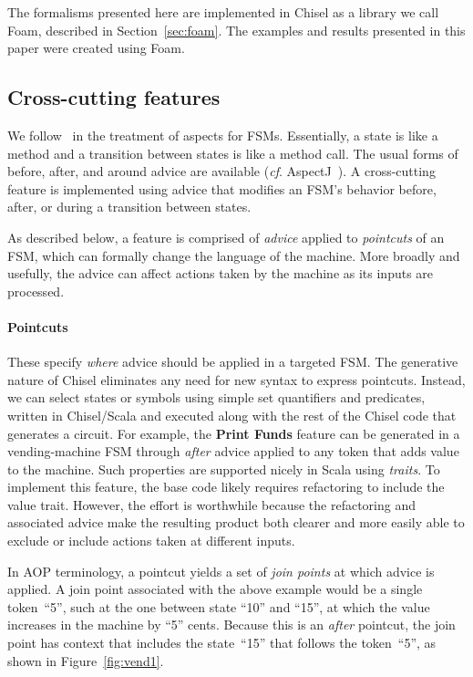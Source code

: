 \documentclass[sigplan,anonymous,review]{acmart}
\begin{document}
The formalisms presented here are implemented in Chisel as a library we call Foam, described in Section~\ref{sec:foam}.  The examples and results presented in this paper were created using Foam.  

\subsection{Cross-cutting features}\label{sec:ccut}
We follow~\cite{aspectsUML} in the treatment of aspects for FSMs.  Essentially, a state is like a method and a transition between states is like a method call.  The usual forms of before, after, and around advice are available (\emph{cf}. AspectJ~\cite{AspectJ:01}).   A cross-cutting feature is implemented using advice that modifies an FSM's behavior before, after, or during a transition between states.

As described below, a feature is comprised of \emph{advice} applied to \emph{pointcuts} of an FSM, which can formally change the language of the machine.  More broadly and usefully, the advice can affect actions taken by the machine as its inputs are processed.  

\paragraph{Pointcuts} These specify \emph{where} advice should be applied in a targeted FSM.   The generative nature of Chisel eliminates any need for new syntax to express pointcuts.  Instead, we can select states or symbols using simple set quantifiers and predicates, written in Chisel/Scala and executed along with the rest of the Chisel code that generates a circuit.  For example, the \textbf{Print Funds} feature can be generated in a vending-machine FSM through \emph{after} advice applied to any token that adds value to the machine.  Such properties are supported nicely in Scala using \emph{traits}.  To implement this feature, the base code likely requires refactoring to include the value trait.  However, the effort is worthwhile because the refactoring and associated advice make the resulting product both clearer and more easily able to exclude or include actions taken at different inputs.

In AOP terminology, a pointcut yields a set of \emph{join points} at which advice is applied.  A join point associated with the above example would be a single token~``5'', such at the one between state ``10'' and ``15'', at which the value increases in the machine by ``5'' cents.  Because this is an \emph{after} pointcut, the join point has context that includes the state~``15'' that follows the token~``5'', as shown in Figure~\ref{fig:vend1}. 
\end{document}
